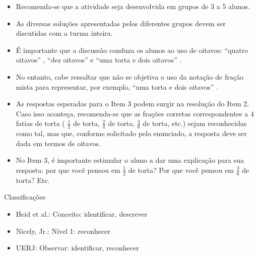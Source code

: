 \documentclass[oneside]{book}
\begin{document}
\begin{multicols}{2}
\begin{itemize} %
    \item       Recomenda-se que a atividade seja desenvolvida em grupos de 3 a 5 alunos.
    \item       As diversas soluções apresentadas pelos diferentes grupos devem ser discutidas com a turma inteira.
    \item       É importante que a discussão conduza os alunos ao uso de oitavos:       ``quatro oitavos''      ,       ``dez oitavos''       e       ``uma torta e dois oitavos''      .
    \item       No entanto, cabe ressaltar que não se objetiva o uso da notação de fração mista para representar, por exemplo,       ``uma torta e dois oitavos''      .
    \item       As respostas esperadas para o Item 3 podem surgir na resolução do Item 2. Caso isso aconteça, recomenda-se que as frações corretas correspondentes a       $4$       fatias de torta (      $\frac{1}{2}$       de torta,       $\frac{2}{4}$       de torta,       $\frac{3}{6}$       de torta, etc.) sejam reconhecidas como tal, mas que, conforme solicitado pelo enunciado, a resposta deve ser dada em termos de oitavos.
    \item       No Item 3, é importante estimular o aluno a dar uma explicação para sua resposta: por que você pensou em       $\frac{1}{2}$       de torta? Por que você pensou em       $\frac{3}{6}$       de torta? Etc.
\end{itemize} %


  Classificações
\begin{itemize} %
    \item       Heid et al.: Conceito: identificar, descrever
    \item       Nicely, Jr.: Nível 1: reconhecer
    \item       UERJ: Observar: identificar, reconhecer
\end{itemize} %





\end{multicols}
\end{document}
